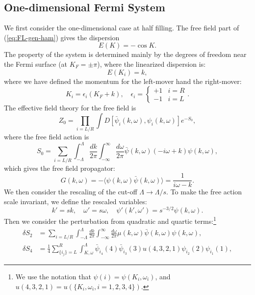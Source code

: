 \subsection{One-dimensional Fermi System}

We first consider the one-dimensional case at half filling.
The free field part of (\ref{eq:FL-gen-ham}) gives the dispersion
\begin{equation}
	E(K) = -\cos K.
\end{equation}
The property of the system is determined mainly by the degrees of freedom near the Fermi surface (at $K_F = \pm\pi$), where the linearized dispersion is:
\begin{equation}
	E(K_i) = k, 
\end{equation}
where we have defined the momentum for the left-mover hand the right-mover:
\begin{equation}
	K_i = \epsilon_i (K_F + k), \quad 
	\epsilon_i = \begin{cases}
		+1 & i=R \\
		-1 & i=L
	\end{cases}.
\end{equation}
The effective field theory for the free field is
\begin{equation}
	Z_0 = \prod_{i=L/R}\int D\left[\bar\psi_i(k,\omega),\psi_i(k,\omega)\right] e^{-S_0},
\end{equation}
where the free field action is
\begin{equation}
	S_0 = \sum_{i=L/R} \int^\Lambda_{-\Lambda} \frac{dk}{2\pi} \int^\infty_{-\infty} \frac{d\omega}{2\pi} 
	\bar\psi(k,\omega)(-i\omega+k)\psi(k,\omega),
\end{equation}
which gives the free field propagator:
\begin{equation}
	G(k,\omega) = -\langle \psi(k,\omega)\bar\psi(k,\omega)\rangle 
	= \frac{1}{i\omega - k}.
\end{equation}
We then consider the rescaling of the cut-off $\Lambda \rightarrow \Lambda/s$. 
To make the free action scale invariant, we define the rescaled variables:
\begin{equation}
	k' = sk, \quad \omega' = s\omega, \quad \psi'(k',\omega') = s^{-3/2}\psi(k,\omega).
\end{equation}
Then we consider the perturbation from quadratic and quartic terms:\footnote{We use the notation that $\psi(i) = \psi(K_i,\omega_i)$, and $u(4,3,2,1) = u(\{K_i,\omega_i,i=1,2,3,4\})$.}
\begin{equation}
\begin{aligned}
	\delta S_2 &= \sum_{i=L/R} \int^\Lambda_{-\Lambda}\frac{dk}{2\pi}\int^\infty_{-\infty} \frac{d\omega}{2\pi} 
	\mu(k,\omega) \bar\psi(k,\omega) \psi(k,\omega), \\
	\delta S_4 &= \frac{1}{4} \sum_{\{i_j\}=L}^R \int^\Lambda_{K,\omega} 
	\bar\psi_{i_4}(4)\bar\psi_{i_3}(3)
	u(4,3,2,1)\psi_{i_2}(2)\psi_{i_1}(1),
\end{aligned}
\end{equation}
